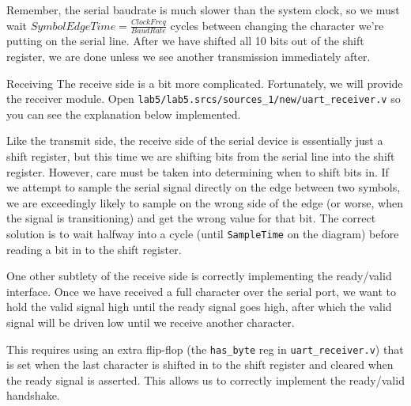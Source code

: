\documentclass[11pt]{article}
\makeatletter
\renewcommand{\subsection}
{\@startsection {subsection}{1}{0pt}
 {-1ex}
 {0.5ex}
 {\bfseries\normalsize}}
\makeatother
\begin{document}
Remember, the serial baudrate is much slower than the system clock, so we must wait $SymbolEdgeTime = \frac{ClockFreq}{BaudRate}$ cycles between changing the character we're putting on the serial line. After we have shifted all 10 bits out of the shift register, we are done unless we see another transmission immediately after.

\subsection{Receiving}
The receive side is a bit more complicated. Fortunately, we will provide the receiver module. Open \verb|lab5/lab5.srcs/sources_1/new/uart_receiver.v| so you can see the explanation below implemented.

Like the transmit side, the receive side of the serial device is essentially just a shift register, but this time we are shifting bits from the serial line into the shift register. However, care must be taken into determining when to shift bits in. If we attempt to sample the serial signal directly on the edge between two symbols, we are exceedingly likely to sample on the wrong side of the edge (or worse, when the signal is transitioning) and get the wrong value for that bit. The correct solution is to wait halfway into a cycle (until \verb|SampleTime| on the diagram) before reading a bit in to the shift register.

One other subtlety of the receive side is correctly implementing the ready/valid interface. Once we have received a full character over the serial port, we want to hold the valid signal high until the ready signal goes high, after which the valid signal will be driven low until we receive another character.

This requires using an extra flip-flop (the \verb|has_byte| reg in \verb|uart_receiver.v|) that is set when the last character is shifted in to the shift register and cleared when the ready signal is asserted. This allows us to correctly implement the ready/valid handshake.
\end{document}
